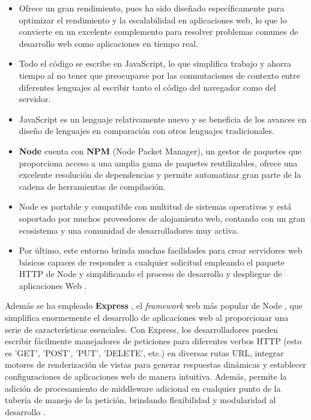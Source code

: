 \documentclass[12pt]{article}
\begin{document}
\begin{itemize}
\item Ofrece un gran rendimiento, pues ha sido diseñado específicamente para optimizar el rendimiento y la
escalabilidad en aplicaciones web, lo que lo convierte en un excelente complemento para resolver problemas comunes de desarrollo web como aplicaciones
en tiempo real. 
\item Todo el código se escribe en JavaScript, lo que simplifica trabajo y ahorra tiempo al no tener que preocuparse por las conmutaciones
de contexto entre diferentes lenguajes al escribir tanto el código del navegador como del servidor. 
\item JavaScript es un lenguaje relativamente nuevo y se beneficia de los avances en diseño de lenguajes en comparación con otros lenguajes tradicionales. 
\item \textbf{Node} cuenta con \textbf{NPM} (Node Packet Manager), un gestor de paquetes que proporciona acceso a una amplia gama de paquetes reutilizables, ofrece una excelente resolución de dependencias y permite automatizar
gran parte de la cadena de herramientas de compilación. 
\item Node es portable y compatible con multitud de sistemas operativos y está soportado por muchos proveedores de alojamiento web, contando con un gran ecosistema y una comunidad de desarrolladores muy activa. 
\item Por último, este entorno brinda muchas facilidades para crear servidores web básicos capaces de responder a cualquier solicitud empleando el paquete HTTP de Node y simplificando el proceso de desarrollo y despliegue de
aplicaciones Web \cite{node-express}.
\end{itemize}

Además se ha empleado \textbf{Express} \cite{express}, el \textit{framework} web más popular de Node \cite{express-popular}, que simplifica enormemente el desarrollo de aplicaciones web al proporcionar
una serie de características esenciales. Con Express, los desarrolladores pueden escribir fácilmente manejadores de peticiones para diferentes 
verbos HTTP (esto es 'GET', 'POST', 'PUT', 'DELETE', etc.) en diversas rutas URL, integrar motores de renderización de vistas para generar respuestas dinámicas y establecer configuraciones de 
aplicaciones web de manera intuitiva. Además, permite la adición de procesamiento de middleware adicional en cualquier punto de la tubería de manejo de 
la petición, brindando flexibilidad y modularidad al desarrollo \cite{node-express}. 
\end{document}
